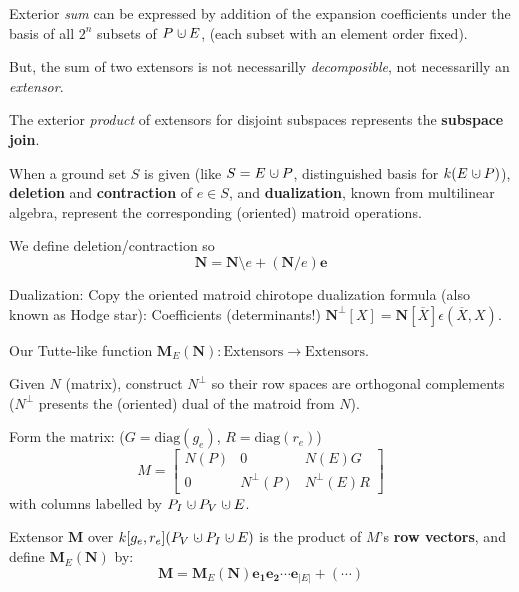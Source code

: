 \documentclass[%
  slidesonly,%
  semlayer,%
  amsmath
  ]{seminar}                                  %
\newcommand{\dunion}
{\mbox{\hbox{\hskip0.45em$\cdot$\hskip-0.44em$\cup$\hskip0.2em}}}
\begin{document}
\begin{slide}
Exterior \textit{sum} can be expressed by addition of the expansion coefficients
under the basis of all $2^n$ subsets of $P\dunion E$, (each subset with an element order fixed).

But, the sum of two extensors is not necessarilly \textit{decomposible}, not necessarilly
an \textit{extensor}.

The exterior \textit{product} of extensors for disjoint subspaces represents the
\textbf{subspace join}.

When a ground set $S$ is given (like $S=E\dunion P$, distinguished basis for 
$k(E\dunion P)$), \textbf{deletion} and  \textbf{contraction} of $e\in S$, 
and \textbf{dualization}, known from multilinear algebra, represent
the corresponding (oriented) matroid operations.

We define deletion/contraction so 
\[
\mathbf{N} = \mathbf{N}\setminus e + (\mathbf{N}/e)\mathbf{e}
\]

Dualization: Copy the oriented matroid chirotope dualization formula
(also known as Hodge star): Coefficients (determinants!)
$\mathbf{N}^{\perp}[X]=\mathbf{N}[\overline{X}]\epsilon(\overline{X},X)$.

\end{slide}
\begin{slide}

Our Tutte-like function $\mathbf{M}_E(\mathbf{N}):\text{Extensors}\rightarrow\text{Extensors}$.

Given $N$ (matrix), construct $N^\perp$ so their row spaces are orthogonal
complements ($N^\perp$ presents the (oriented) dual of the matroid from $N$).

Form the matrix:  ($G=\mbox{diag}(g_e)$, $R=\mbox{diag}(r_e)$)
\[
M = \left[\begin{array}{c|c|c} N(P)  &  0  &  N(E)G \\  \hline
0  & N^{\perp}(P)  &  N^{\perp}(E)R \end{array}\right]
\]
with columns labelled by $P_I\dunion P_V\dunion E$.

Extensor $\mathbf{M}$ over $k[g_e, r_e](P_V\dunion P_I \dunion E)$
is the product of $M$'s \textbf{row vectors}, and define $\mathbf{M}_E(\mathbf{N})$ by:
\[
\mathbf{M} = \mathbf{M}_E(\mathbf{N})\mathbf{e_1}\mathbf{e_2}\cdots\mathbf{e}_{|E|} + (\cdots) 
\]


\end{slide}
\end{document}

